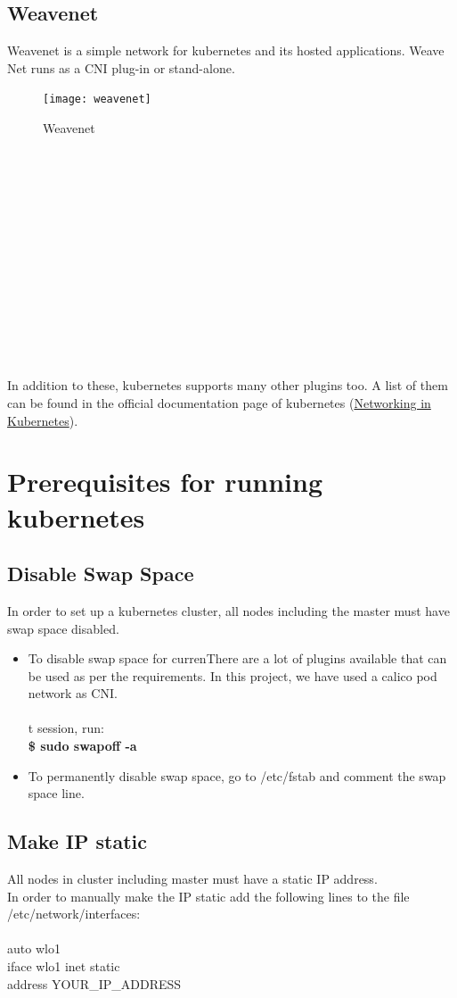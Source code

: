 \documentclass[12pt]{report}
\begin{document}
\subsection{Weavenet}
Weavenet is a simple network for kubernetes and its hosted applications. Weave Net runs as a CNI plug-in or stand-alone.
\begin{figure}[h!]
	\begin{center}
		\texttt{[image: weavenet]}
		\caption{Weavenet \cite{Weavenet}}
	\end{center}
\end{figure}
\\\\\\\\\\\\\\\\\\\\\\\\
\\In addition to these, kubernetes supports many other plugins too. A list of them can be found in the official documentation page of kubernetes (\href{https://kubernetes.io/docs/concepts/cluster-administration/networking/}{Networking in Kubernetes})\cite{Knet}.
\section{Prerequisites for running kubernetes \cite{Prereq}}
\subsection{Disable Swap Space}
In order to set up a kubernetes cluster, all nodes including the master must have swap space disabled.
\begin{itemize}
	\item To disable swap space for currenThere are a lot of plugins available that can be used as per the requirements. In this project, we have used a calico pod network as CNI.\\\\t session, run: \\
	\textbf{\$ sudo swapoff -a}
	\item To permanently disable swap space, go to /etc/fstab and comment the swap space line.
\end{itemize}
\subsection{Make IP static}
All nodes in cluster including master must have a static IP address.\\
In order to manually make the IP static add the following lines to the file /etc/network/interfaces:\\\\
auto wlo1\\
iface wlo1 inet static\\
address  YOUR\_IP\_ADDRESS
\end{document}
